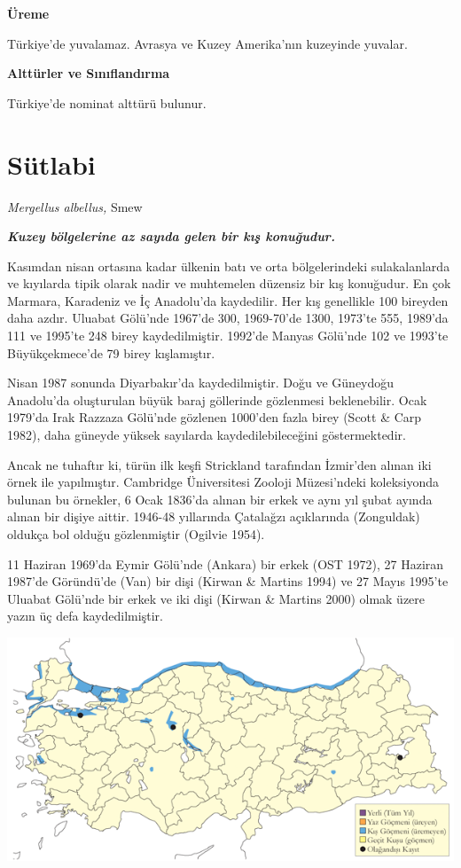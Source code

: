 \documentclass[
  letterpaper,
  DIV=11,
  numbers=noendperiod]{scrreprt}
\begin{document}
\textbf{Üreme}

Türkiye'de yuvalamaz. Avrasya ve Kuzey Amerika'nın kuzeyinde yuvalar.

\textbf{Alttürler ve Sınıflandırma}

Türkiye'de nominat alttürü bulunur.

\section{Sütlabi}\label{suxfctlabi}

\emph{Mergellus albellus,} Smew

\textbf{\emph{Kuzey bölgelerine az sayıda gelen bir kış konuğudur.}}

Kasımdan nisan ortasına kadar ülkenin batı ve orta bölgelerindeki
sulakalanlarda ve kıyılarda tipik olarak nadir ve muhtemelen düzensiz
bir kış konuğudur. En çok Marmara, Karadeniz ve İç Anadolu'da
kaydedilir. Her kış genellikle 100 bireyden daha azdır. Uluabat Gölü'nde
1967'de 300, 1969-70'de 1300, 1973'te 555, 1989'da 111 ve 1995'te 248
birey kaydedilmiştir. 1992'de Manyas Gölü'nde 102 ve 1993'te
Büyükçekmece'de 79 birey kışlamıştır.

Nisan 1987 sonunda Diyarbakır'da kaydedilmiştir. Doğu ve Güneydoğu
Anadolu'da oluşturulan büyük baraj göllerinde gözlenmesi beklenebilir.
Ocak 1979'da Irak Razzaza Gölü'nde gözlenen 1000'den fazla birey (Scott
\& Carp 1982), daha güneyde yüksek sayılarda kaydedilebileceğini
göstermektedir.

Ancak ne tuhaftır ki, türün ilk keşfi Strickland tarafından İzmir'den
alınan iki örnek ile yapılmıştır. Cambridge Üniversitesi Zooloji
Müzesi'ndeki koleksiyonda bulunan bu örnekler, 6 Ocak 1836'da alınan bir
erkek ve aynı yıl şubat ayında alınan bir dişiye aittir. 1946-48
yıllarında Çatalağzı açıklarında (Zonguldak) oldukça bol olduğu
gözlenmiştir (Ogilvie 1954).

11 Haziran 1969'da Eymir Gölü'nde (Ankara) bir erkek (OST 1972), 27
Haziran 1987'de Göründü'de (Van) bir dişi (Kirwan \& Martins 1994) ve 27
Mayıs 1995'te Uluabat Gölü'nde bir erkek ve iki dişi (Kirwan \& Martins
2000) olmak üzere yazın üç defa kaydedilmiştir.

\includegraphics{images/harita_Page_032.png}
\end{document}
